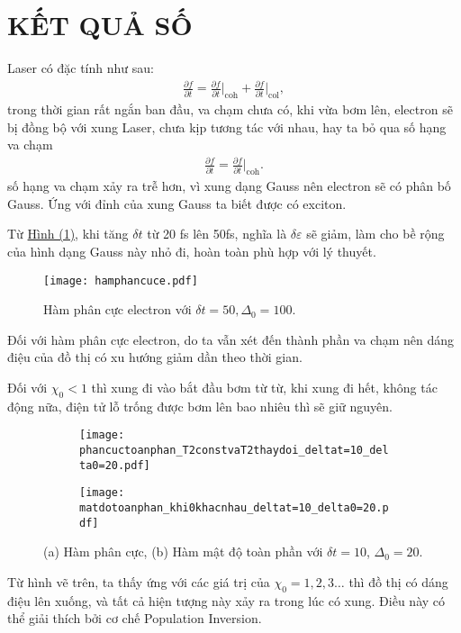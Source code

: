 \documentclass[%
reprint,
amsmath,amssymb,
superscriptaddress,
aps,
]{revtex4-2}
\newcommand{\at}[2]{\bigg\rvert_{#1}^{#2} }
\begin{document}
\section{\label{sec:level3} KẾT QUẢ SỐ}
Laser có đặc tính như sau:
\begin{equation}
	\begin{aligned}
		\frac{\partial f}{\partial t} = \frac{\partial f}{\partial t} \at{\text{coh}}{} +\frac{\partial f}{\partial t} \at{\text{col}}{},
	\end{aligned}
\end{equation}
trong thời gian rất ngắn ban đầu, va chạm chưa có, khi vừa bơm lên, electron sẽ bị đồng bộ với xung Laser, chưa kịp tương tác với nhau, hay ta bỏ qua số hạng va chạm 
\begin{equation}
	\begin{aligned}
		\frac{\partial f}{\partial t} = \frac{\partial f}{\partial t} \at{\text{coh}}{}.
	\end{aligned}
\end{equation}
số hạng va chạm xảy ra trễ hơn, vì xung dạng Gauss nên electron sẽ có phân bố Gauss. Ứng với đỉnh của xung Gauss ta biết được có exciton.

Từ \hyperref[fig:HamPhanBoElectronDeltat=50]{Hình (1)}, khi tăng $\delta t$ từ 20 fs lên 50fs, nghĩa là $\delta \varepsilon$ sẽ giảm, làm cho bề rộng của hình dạng Gauss này nhỏ đi, hoàn toàn phù hợp với lý thuyết.\\
\begin{figure}[H]
	\texttt{[image: hamphancuce.pdf]}
	\caption{\label{fig:Ham phan cuc} Hàm phân cực electron với $\delta t = 50, \Delta_{0} = 100$.}
\end{figure}
Đối với hàm phân cực electron, do ta vẫn xét đến thành phần va chạm nên dáng điệu của đồ thị có xu hướng giảm dần theo thời gian. 

Đối với $\chi_0 < 1$ thì xung đi vào bắt đầu bơm từ từ, khi xung đi hết, không tác động nữa, điện tử lỗ trống được bơm lên bao nhiêu thì sẽ giữ nguyên.
\begin{figure*}[htb]
	\centering
	\begin{subfigure}[b]{0.485\textwidth}
		\centering
		\texttt{[image: phancuctoanphan\_T2constvaT2thaydoi\_deltat=10\_delta0=20.pdf]}
		\caption{}
		\label{fig:phan cuc toan phan}
	\end{subfigure}
	\begin{subfigure}[b]{0.485\textwidth}
		\centering
		\texttt{[image: matdotoanphan\_khi0khacnhau\_deltat=10\_delta0=20.pdf]}
		\caption{}
		\label{fig:mat do toan phan}
	\end{subfigure}
	\caption{
		(a) Hàm phân cực, 
		(b) Hàm mật độ toàn phần với $\delta t = 10$, $\Delta_{0}=20$. 
	}
\end{figure*}
Từ hình vẽ trên, ta thấy ứng với các giá trị của $\chi_0 = 1,2,3\ldots$ thì đồ thị có dáng điệu lên xuống, và tất cả hiện tượng này xảy ra trong lúc có xung. Điều này có thể giải thích bởi cơ chế Population Inversion.
\end{document}
